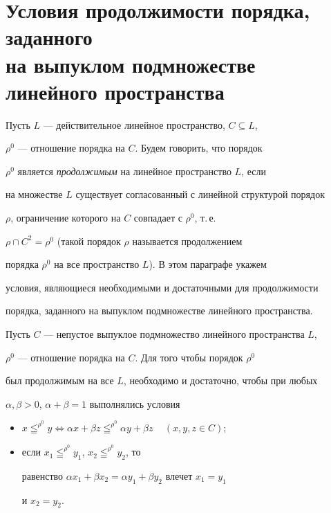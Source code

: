  


\section{Условия продолжимости порядка, заданного\protect\\ 


на выпуклом подмножестве линейного пространства} 


 


Пусть $L$ --- действительное линейное пространство, $C\subseteq L$, 


$\rho^0$ --- отношение порядка на $C$. Будем говорить, что порядок 


$\rho^0$ является {\em продолжимым} на линейное пространство $L$, если 


на множестве $L$ существует согласованный с линейной структурой порядок 


$\rho$, ограничение которого на $C$ совпадает с $\rho^0$, т.\,е. 


$\rho\cap C^2=\rho^0$ (такой порядок $\rho$ называется продолжением 


порядка $\rho^0$ на все пространство $L$). В этом параграфе укажем 


условия, являющиеся необходимыми и достаточными для продолжимости 


порядка, заданного на выпуклом подмножестве линейного пространства. 


 


\begin{thm} 


Пусть $C$ --- непустое выпуклое подмножество линейного пространства $L$, 


$\rho^0$ --- отношение порядка на $C$. Для того чтобы порядок $\rho^0$ 


был продолжимым на все $L$, необходимо и достаточно, чтобы при любых 


$\alpha,\beta>0$, $\alpha+\beta=1$ выполнялись условия 


\begin{itemize} 


\item[(A3)] $x\leqq^{\rho^0}y\Longleftrightarrow \alpha x+\beta z 


\leqq^{\rho^0}\alpha y+\beta z$ \ \; $(x,y,z\in C);$ 


\item[(A4)] если $x_1\leqq^{\rho^0}y_1$, $x_2\leqq^{\rho^0}y_2$, то 


равенство $\alpha x_1+\beta x_2=\alpha y_1+\beta y_2$ влечет $x_1=y_1$ 


и $x_2=y_2$. 


\end{itemize} 


\end{thm} 


